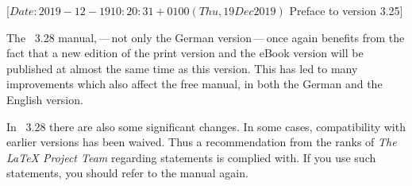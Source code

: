 %
%
%
%
%
%
%
%
%

                 [$Date: 2019-12-19 10:20:31 +0100 (Thu, 19 Dec 2019) $
                  Preface to version 3.25]



The \KOMAScript~3.28 manual,\,---\,not only the German version\,---\,once
again benefits from the fact that a new edition of the print version
\cite{book:komascript} and the eBook version \cite{ebook:komascript} will be
published at almost the same time as this version. This has led to many
improvements which also affect the free manual, in both the German and the
English version.

In \KOMAScript~3.28 there are also some significant changes. In some cases,
compatibility with earlier versions has been waived. Thus a recommendation
from the ranks of \emph{The LaTeX Project Team} regarding 
statements is complied with. If you use such statements, you should refer to
the manual again.


